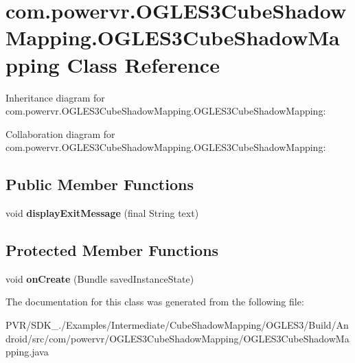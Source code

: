 \hypertarget{classcom_1_1powervr_1_1_o_g_l_e_s3_cube_shadow_mapping_1_1_o_g_l_e_s3_cube_shadow_mapping}{\section{com.\+powervr.\+O\+G\+L\+E\+S3\+Cube\+Shadow\+Mapping.\+O\+G\+L\+E\+S3\+Cube\+Shadow\+Mapping Class Reference}
\label{classcom_1_1powervr_1_1_o_g_l_e_s3_cube_shadow_mapping_1_1_o_g_l_e_s3_cube_shadow_mapping}
}


Inheritance diagram for com.\+powervr.\+O\+G\+L\+E\+S3\+Cube\+Shadow\+Mapping.\+O\+G\+L\+E\+S3\+Cube\+Shadow\+Mapping\+:


Collaboration diagram for com.\+powervr.\+O\+G\+L\+E\+S3\+Cube\+Shadow\+Mapping.\+O\+G\+L\+E\+S3\+Cube\+Shadow\+Mapping\+:
\subsection*{Public Member Functions}
\begin{DoxyCompactItemize}
\item 
\hypertarget{classcom_1_1powervr_1_1_o_g_l_e_s3_cube_shadow_mapping_1_1_o_g_l_e_s3_cube_shadow_mapping_a50437f0634d41d80d63742342e44133d}{void {\bfseries display\+Exit\+Message} (final String text)}\label{classcom_1_1powervr_1_1_o_g_l_e_s3_cube_shadow_mapping_1_1_o_g_l_e_s3_cube_shadow_mapping_a50437f0634d41d80d63742342e44133d}

\end{DoxyCompactItemize}
\subsection*{Protected Member Functions}
\begin{DoxyCompactItemize}
\item 
\hypertarget{classcom_1_1powervr_1_1_o_g_l_e_s3_cube_shadow_mapping_1_1_o_g_l_e_s3_cube_shadow_mapping_adf14dfefb6a94b9c9b12117b0539909b}{void {\bfseries on\+Create} (Bundle saved\+Instance\+State)}\label{classcom_1_1powervr_1_1_o_g_l_e_s3_cube_shadow_mapping_1_1_o_g_l_e_s3_cube_shadow_mapping_adf14dfefb6a94b9c9b12117b0539909b}

\end{DoxyCompactItemize}


The documentation for this class was generated from the following file\+:\begin{DoxyCompactItemize}
\item 
P\+V\+R/\+S\+D\+K\+\_./\+Examples/\+Intermediate/\+Cube\+Shadow\+Mapping/\+O\+G\+L\+E\+S3/\+Build/\+Android/src/com/powervr/\+O\+G\+L\+E\+S3\+Cube\+Shadow\+Mapping/O\+G\+L\+E\+S3\+Cube\+Shadow\+Mapping.\+java\end{DoxyCompactItemize}
